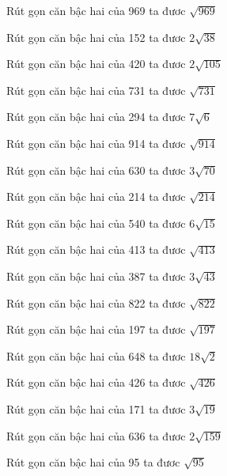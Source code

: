 \documentclass[12pt,a4paper]{article}
\begin{document}
\begin{ex}
Rút gọn căn bậc hai của 969 ta đươc $\sqrt{969}$
\end{ex}
\begin{ex}
Rút gọn căn bậc hai của 152 ta đươc $2\sqrt{38}$
\end{ex}
\begin{ex}
Rút gọn căn bậc hai của 420 ta đươc $2\sqrt{105}$
\end{ex}
\begin{ex}
Rút gọn căn bậc hai của 731 ta đươc $\sqrt{731}$
\end{ex}
\begin{ex}
Rút gọn căn bậc hai của 294 ta đươc $7\sqrt{6}$
\end{ex}
\begin{ex}
Rút gọn căn bậc hai của 914 ta đươc $\sqrt{914}$
\end{ex}
\begin{ex}
Rút gọn căn bậc hai của 630 ta đươc $3\sqrt{70}$
\end{ex}
\begin{ex}
Rút gọn căn bậc hai của 214 ta đươc $\sqrt{214}$
\end{ex}
\begin{ex}
Rút gọn căn bậc hai của 540 ta đươc $6\sqrt{15}$
\end{ex}
\begin{ex}
Rút gọn căn bậc hai của 413 ta đươc $\sqrt{413}$
\end{ex}
\begin{ex}
Rút gọn căn bậc hai của 387 ta đươc $3\sqrt{43}$
\end{ex}
\begin{ex}
Rút gọn căn bậc hai của 822 ta đươc $\sqrt{822}$
\end{ex}
\begin{ex}
Rút gọn căn bậc hai của 197 ta đươc $\sqrt{197}$
\end{ex}
\begin{ex}
Rút gọn căn bậc hai của 648 ta đươc $18\sqrt{2}$
\end{ex}
\begin{ex}
Rút gọn căn bậc hai của 426 ta đươc $\sqrt{426}$
\end{ex}
\begin{ex}
Rút gọn căn bậc hai của 171 ta đươc $3\sqrt{19}$
\end{ex}
\begin{ex}
Rút gọn căn bậc hai của 636 ta đươc $2\sqrt{159}$
\end{ex}
\begin{ex}
Rút gọn căn bậc hai của 95 ta đươc $\sqrt{95}$
\end{ex}
\end{document}

